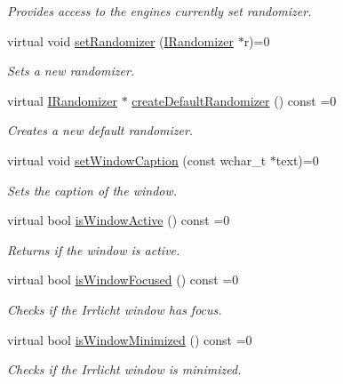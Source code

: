 \begin{DoxyCompactItemize}
\begin{DoxyCompactList}\small\item\em Provides access to the engine\textquotesingle{}s currently set randomizer. \end{DoxyCompactList}\item 
virtual void \hyperlink{classirr_1_1IrrlichtDevice_af996a8a8031dacd823e3c65ee3ed2c33}{set\+Randomizer} (\hyperlink{classirr_1_1IRandomizer}{I\+Randomizer} $\ast$r)=0
\begin{DoxyCompactList}\small\item\em Sets a new randomizer. \end{DoxyCompactList}\item 
virtual \hyperlink{classirr_1_1IRandomizer}{I\+Randomizer} $\ast$ \hyperlink{classirr_1_1IrrlichtDevice_aabebf76ae1e89d9fd9ec562ece4c252e}{create\+Default\+Randomizer} () const  =0
\begin{DoxyCompactList}\small\item\em Creates a new default randomizer. \end{DoxyCompactList}\item 
virtual void \hyperlink{classirr_1_1IrrlichtDevice_a3d7c98d520bf18ce1973c6f1439a7c0f}{set\+Window\+Caption} (const wchar\+\_\+t $\ast$text)=0
\begin{DoxyCompactList}\small\item\em Sets the caption of the window. \end{DoxyCompactList}\item 
virtual bool \hyperlink{classirr_1_1IrrlichtDevice_a8ef9d5b648a17e6f2e3afd36fde38dcc}{is\+Window\+Active} () const  =0
\begin{DoxyCompactList}\small\item\em Returns if the window is active. \end{DoxyCompactList}\item 
virtual bool \hyperlink{classirr_1_1IrrlichtDevice_a24a6b3c67db6b5babc7d0a90bf01fb40}{is\+Window\+Focused} () const  =0
\begin{DoxyCompactList}\small\item\em Checks if the Irrlicht window has focus. \end{DoxyCompactList}\item 
virtual bool \hyperlink{classirr_1_1IrrlichtDevice_a30fc94cba79061a6c130ebb728149dcb}{is\+Window\+Minimized} () const  =0
\begin{DoxyCompactList}\small\item\em Checks if the Irrlicht window is minimized. \end{DoxyCompactList}\item 

\end{DoxyCompactItemize}
